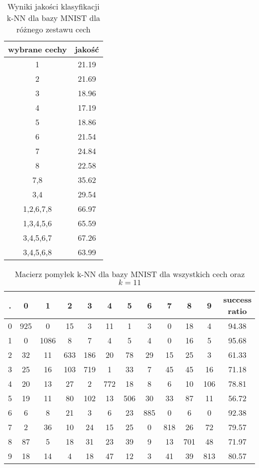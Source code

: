 \documentclass{classrep}
\begin{document}
\begin{table}[h!]
  \centering
  \caption{Wyniki jakości klasyfikacji k-NN dla bazy MNIST dla różnego zestawu cech}
  \label{tab:tab1}
  \begin{tabular}{|c|c|}
    \hline
	wybrane cechy & jakość\\
    \hline
	1 & 21.19\\
    \hline
	2 & 21.69\\
	\hline
	3 & 18.96\\
	\hline
	4 & 17.19\\
	\hline
	5 & 18.86\\
	\hline
	6 & 21.54\\
	\hline
	7 & 24.84\\
	\hline
	8 & 22.58\\
	\hline
	7,8 & 35.62\\
	\hline
	3,4 & 29.54\\
	\hline
	1,2,6,7,8 & 66.97\\
	\hline
	1,3,4,5,6 & 65.59\\
	\hline
	3,4,5,6,7 & 67.26\\
	\hline
	3,4,5,6,8 & 63.99\\
	\hline
  \end{tabular}
\end{table}

\begin{table}[h!]
  \centering
  \caption{Macierz pomyłek k-NN dla bazy MNIST dla wszystkich cech oraz $k=11$}
  \label{tab:tab1}
  \begin{tabular}{|c|c|c|c|c|c|c|c|c|c|c|c|}
    \hline
	. & 0 & 1 & 2 & 3 & 4 & 5 & 6 & 7 & 8 & 9 & success ratio \\
    \hline
	0 & 925 & 0 & 15 & 3 & 11 & 1 & 3 & 0 & 18 & 4 & 94.38\\
    \hline
	1 & 0 & 1086 & 8 & 7 & 4 & 5 & 4 & 0 & 16 & 5 & 95.68\\
	\hline
	2 & 32 & 11 & 633 & 186 & 20 & 78 & 29 & 15 & 25 & 3 & 61.33\\
	\hline
	3 & 25 & 16 & 103 & 719 & 1 & 33 & 7 & 45 & 45 & 16 & 71.18\\
	\hline
	4 & 20 & 13 & 27 & 2 & 772 & 18 & 8 & 6 & 10 & 106 & 78.81\\
	\hline
	5 & 19 & 11 & 80 & 102 & 13 & 506 & 30 & 33 & 87 & 11 & 56.72\\
	\hline
	6 & 6 & 8 & 21 & 3 & 6 & 23 & 885 & 0 & 6 & 0 & 92.38\\
	\hline
	7 & 2 & 36 & 10 & 24 & 15 & 25 & 0 & 818 & 26 & 72 & 79.57\\
	\hline
	8 & 87 & 5 & 18 & 31 & 23 & 39 & 9 & 13 & 701 & 48 & 71.97\\
	\hline
	9 & 18 & 14 & 4 & 18 & 47 & 12 & 3 & 41 & 39 & 813 & 80.57\\    
    \hline
  \end{tabular}
\end{table}
\end{document}
